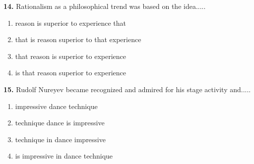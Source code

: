 \documentclass[12pt]{article}
\begin{document}
\par
\vspace{0.25\baselineskip}
\noindent\textbf{14.} Rationalism as a philosophical trend was based on the idea.....
\begin{enumerate}[label=(\Alph*),leftmargin=*,itemsep=0.2em]
\item reason is superior to experience that
\item that is reason superior to that experience
\item that reason is superior to experience
\item is that reason superior to experience
\end{enumerate}
\par
\vspace{0.25\baselineskip}
\noindent\textbf{15.} Rudolf Nureyev became recognized and admired for his stage activity and.....
\begin{enumerate}[label=(\Alph*),leftmargin=*,itemsep=0.2em]
\item impressive dance technique
\item technique dance is impressive
\item technique in dance impressive
\item is impressive in dance technique
\end{enumerate}
\par
\vspace{0.25\baselineskip}
\end{document}
